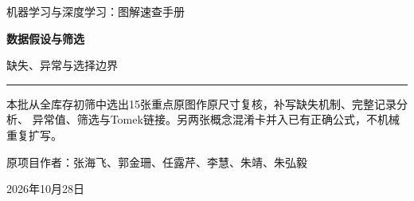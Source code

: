 \documentclass[a4paper,11pt,oneside,openany]{book}
\begin{document}
\frontmatter
\hypersetup{pageanchor=false}
\begin{titlepage}
\vspace*{16mm}
{\sffamily\color{Teal}\large 机器学习与深度学习：图解速查手册\par}
\vspace{15mm}
{\sffamily\bfseries\color{Ink}\Huge 数据假设与筛选\par}
\vspace{6mm}
{\sffamily\color{Ink}\LARGE 缺失、异常与选择边界\par}
\vspace{12mm}
\noindent\textcolor{Teal}{\rule{\textwidth}{1.2pt}}
\vspace{7mm}
\begin{keyidea}[第十四批阶段样章]
本批从全库存初筛中选出15张重点原图作原尺寸复核，补写缺失机制、完整记录分析、
异常值、筛选与Tomek链接。另两张概念混淆卡并入已有正确公式，不机械重复扩写。
\end{keyidea}
\vfill
原项目作者：张海飞、郭金珊、任露芹、李慧、朱靖、朱弘毅\par
\vspace{4mm}
2026年10月28日\par
\end{titlepage}
\hypersetup{pageanchor=true}
\tableofcontents
\mainmatter
\setcounter{chapter}{2}

\end{document}
